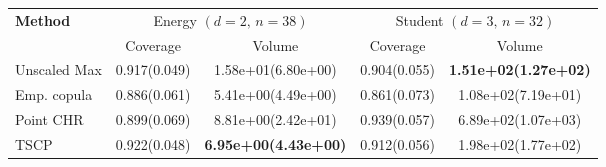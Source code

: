 \small
\begin{subtable}{\textwidth}
\centering
\begin{tabular}[t]{l c c c c }
\midrule

\textbf{Method} & \multicolumn{2}{c}{Energy $(d=2,\, n=38)$} & \multicolumn{2}{c}{Student $(d=3,\, n=32)$} \\
\cmidrule(lr){2-3}\cmidrule(lr){4-5}
& Coverage & Volume & Coverage & Volume \\
\midrule
Unscaled Max & 0.917(0.049) & 1.58e+01(6.80e+00) & 0.904(0.055) & \textbf{{1.51e+02(1.27e+02)}} \\
Emp. copula & \color{red}0.886(0.061) & 5.41e+00(4.49e+00) & \color{red}0.861(0.073) & 1.08e+02(7.19e+01) \\
Point CHR & 0.899(0.069) & 8.81e+00(2.42e+01) & 0.939(0.057) & 6.89e+02(1.07e+03) \\
TSCP & 0.922(0.048) & \textbf{{6.95e+00(4.43e+00)}} & 0.912(0.056) & 1.98e+02(1.77e+02) \\

\bottomrule
\end{tabular}
\end{subtable}
